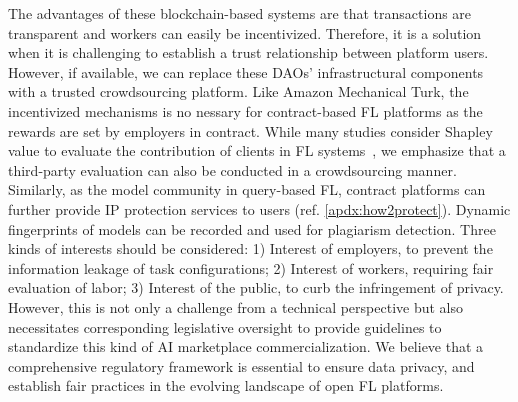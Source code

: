\documentclass[journal]{IEEEtran}
\begin{document}
The advantages of these blockchain-based systems are that transactions are transparent and workers can easily be incentivized.
Therefore, it is a solution when it is challenging to establish a trust relationship between platform users. 
However, if available, we can replace these DAOs' infrastructural components with a trusted crowdsourcing platform.
Like Amazon Mechanical Turk, the incentivized mechanisms is no nessary for contract-based FL platforms as the rewards are set by employers in contract.
While many studies consider Shapley value to evaluate the contribution of clients in FL systems~\cite{zhan2021survey}, we emphasize that a third-party evaluation can also be conducted in a crowdsourcing manner.
Similarly, as the model community in query-based FL, contract platforms can further provide IP protection services to users (ref. \ddag\ref{apdx:how2protect}). 
Dynamic fingerprints of models can be recorded and used for plagiarism detection.
Three kinds of interests should be considered: 1) Interest of employers, to prevent the information leakage of task configurations; 2) Interest of workers, requiring fair evaluation of labor; 3) Interest of the public, to curb the infringement of privacy.
However, this is not only a challenge from a technical perspective but also necessitates corresponding legislative oversight to provide guidelines to standardize this kind of AI marketplace commercialization.
We believe that a comprehensive regulatory framework is essential to ensure data privacy, and establish fair practices in the evolving landscape of open FL platforms.


\balance


\vfill
\end{document}
